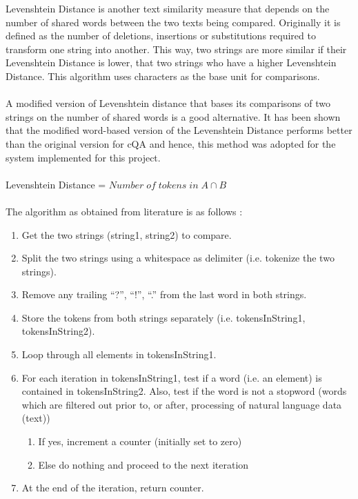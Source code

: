 \documentclass[12pt, a4paper]{article}
\begin{document}
Levenshtein Distance is another text similarity measure that depends on the number of shared words between the two texts being compared. Originally it is defined as the number of deletions, insertions or substitutions required to transform one string into another. This way, two strings are more similar if their Levenshtein Distance is lower, that two strings who have a higher Levenshtein Distance. \cite{levenshteinOrig} This algorithm uses characters as the base unit for comparisons. 
\\~\\ 
A modified version of Levenshtein distance that bases its comparisons of two strings on the number of shared words is a good alternative. It has been shown that the modified word-based version of the Levenshtein Distance \cite{maincqa} performs better than the original version for cQA and hence, this method was adopted for the system implemented for this project. 
\\~\\ 
Levenshtein Distance = \(Number\; of\; tokens\; in\; A\cap B\)
\\~\\ 
The algorithm as obtained from literature \cite{maincqa} is as follows : 

\begin{enumerate}
    \item Get the two strings (string1, string2) to compare.
    \item Split the two strings using a whitespace as delimiter (i.e. tokenize the two strings). 
    \item Remove any trailing “?”, “!”, “.” from the last word in both strings. 
    \item Store the tokens from both strings separately (i.e. tokensInString1, tokensInString2). 
    \item Loop through all elements in tokensInString1. 
    \item For each iteration in tokensInString1, test if a word (i.e. an element) is contained in tokensInString2. Also, test if the word is not a stopword (words which are filtered out prior to, or after, processing of natural language data (text)) 
    \begin{enumerate}
        \item If yes, increment a counter (initially set to zero) 
        \item Else do nothing and proceed to the next iteration 
    \end{enumerate} 
    \item At the end of the iteration, return counter. 
\end{enumerate}
\end{document}
